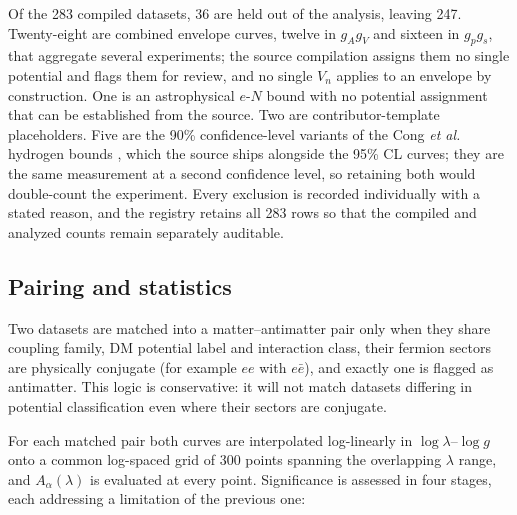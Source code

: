 \documentclass[
  aps,
  prd,
  reprint,
  amsmath,
  amssymb,
  nofootinbib,
  superscriptaddress,
  floatfix
]{revtex4-2}
\newcommand{\Aalpha}{A_\alpha}
\begin{document}
Of the 283 compiled datasets, 36 are held out of the analysis, leaving
247. Twenty-eight are combined envelope curves, twelve in $g_Ag_V$ and
sixteen in $g_pg_s$, that aggregate several experiments; the source compilation assigns them no
single potential and flags them for review, and no single $V_n$ applies to
an envelope by construction. One is an astrophysical $e$-$N$ bound with no
potential assignment that can be established from the source. Two are
contributor-template placeholders. Five are the 90\% confidence-level
variants of the Cong \textit{et al.} hydrogen bounds \cite{Cong2025b},
which the source ships alongside the 95\% CL curves; they are the same
measurement at a second confidence level, so retaining both would
double-count the experiment. Every exclusion is recorded
individually with a stated reason, and the registry retains all 283 rows
so that the compiled and analyzed counts remain separately auditable.

\subsection{Pairing and statistics}

Two datasets are matched into a matter--antimatter pair only when they
share coupling family, DM potential label and interaction class, their
fermion sectors are physically conjugate (for example $ee$ with
$e\bar{e}$), and exactly one is flagged as antimatter. This logic is
conservative: it will not match datasets differing in
potential classification even where their sectors are conjugate.

For each matched pair both curves are interpolated log-linearly in
$\log\lambda$--$\log g$ onto a common log-spaced grid of 300 points
spanning the overlapping $\lambda$ range, and $\Aalpha(\lambda)$ is
evaluated at every point. Significance is assessed in four stages, each
addressing a limitation of the previous one:
\end{document}
